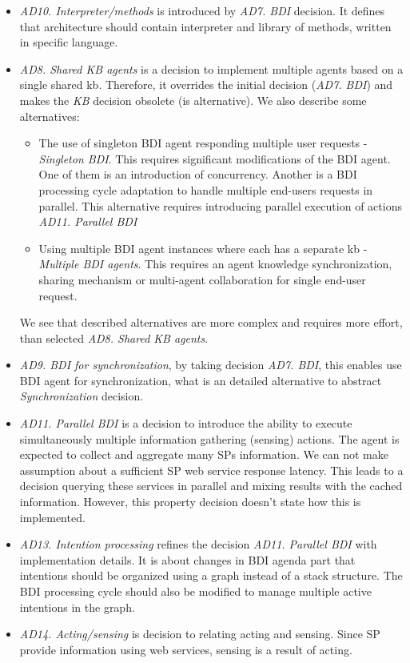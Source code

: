 \documentclass{llncs}
\begin{document}
\begin{itemize}
	\item \emph{AD10. Interpreter/methods} is introduced by \emph{AD7. BDI} decision. It defines that architecture should contain interpreter and library of methods, written in specific language. 
	\item \emph{AD8. Shared KB agents} is a decision to implement multiple agents based on a single shared \gls{kb}. Therefore, it overrides the initial decision (\emph{AD7. BDI}) and makes the \emph{KB} decision obsolete (is alternative). We also describe some alternatives:
	\begin{itemize}
		\item The use of singleton \gls{BDI} agent responding multiple user requests - \emph{Singleton BDI}. This requires significant modifications of the \gls{BDI} agent. One of them is an introduction of concurrency. Another is a \gls{BDI} processing cycle adaptation to handle multiple end-users requests in parallel. This alternative requires introducing parallel execution of actions \emph{AD11. Parallel BDI}
		\item Using multiple \gls{BDI} agent instances where each has a separate \gls{kb} - \emph{Multiple BDI agents}. This requires an agent knowledge synchronization, sharing mechanism or multi-agent collaboration for single end-user request.
	\end{itemize} 
	We see that described alternatives are more complex and requires more effort, than selected \emph{AD8. Shared KB agents}.
	\item \emph{AD9. BDI for synchronization}, by taking decision \emph{AD7. BDI}, this enables use \gls{BDI} agent for synchronization, what is an detailed alternative to abstract \emph{Synchronization} decision.
	\item \emph{AD11. Parallel BDI} is a decision to introduce the ability to execute simultaneously multiple information gathering (sensing) actions. The  agent is expected to collect and aggregate many \gls{SP}s information. We can not make assumption about a sufficient \gls{SP} web service response latency. This leads to a decision querying these services in parallel and mixing results with the cached information. However, this property decision doesn't state how this is implemented.
	\item \emph{AD13. Intention processing} refines the decision \emph{AD11. Parallel BDI} with implementation details. It is about changes in \gls{BDI} agenda part that intentions should be organized using a graph instead of a stack structure. The \gls{BDI} processing cycle should also be modified to manage multiple active intentions in the graph.
	\item \emph{AD14. Acting/sensing} is decision to relating acting and sensing. Since \gls{SP} provide information using web services, sensing is a result of acting.
\end{itemize}
\end{document}
